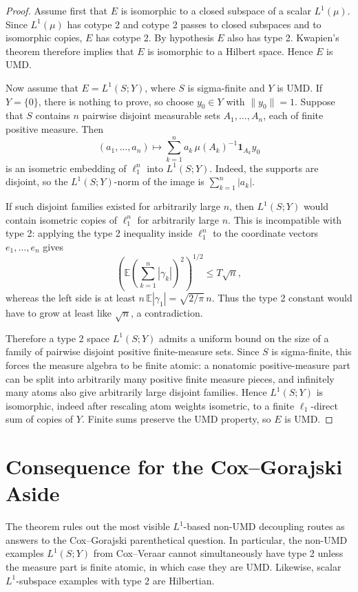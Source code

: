 \documentclass[11pt]{article}
\newcommand{\E}{\mathbb{E}}
\begin{document}
\begin{proof}
Assume first that \(E\) is isomorphic to a closed subspace of a scalar
\(L^1(\mu)\).  Since \(L^1(\mu)\) has cotype 2 and cotype 2 passes to closed
subspaces and to isomorphic copies, \(E\) has cotype 2.  By hypothesis \(E\)
also has type 2.  Kwapien's theorem therefore implies that \(E\) is isomorphic
to a Hilbert space.  Hence \(E\) is UMD.

Now assume that \(E=L^1(S;Y)\), where \(S\) is sigma-finite and \(Y\) is UMD.
If \(Y=\{0\}\), there is nothing to prove, so choose \(y_0\in Y\) with
\(\|y_0\|=1\).  Suppose that \(S\) contains \(n\) pairwise disjoint measurable
sets \(A_1,\ldots,A_n\), each of finite positive measure.  Then
\[
   (a_1,\ldots,a_n)\mapsto
   \sum_{k=1}^n a_k\,\mu(A_k)^{-1}\mathbf{1}_{A_k}y_0
\]
is an isometric embedding of \(\ell_1^n\) into \(L^1(S;Y)\).  Indeed, the
supports are disjoint, so the \(L^1(S;Y)\)-norm of the image is
\(\sum_{k=1}^n |a_k|\).

If such disjoint families existed for arbitrarily large \(n\), then
\(L^1(S;Y)\) would contain isometric copies of \(\ell_1^n\) for arbitrarily
large \(n\).  This is incompatible with type 2: applying the type 2 inequality
inside \(\ell_1^n\) to the coordinate vectors \(e_1,\ldots,e_n\) gives
\[
  \left(\E\left(\sum_{k=1}^n |\gamma_k|\right)^2\right)^{1/2}
  \leq T\sqrt{n},
\]
whereas the left side is at least
\(n\,\E|\gamma_1|=\sqrt{2/\pi}\,n\).  Thus the type 2 constant would have to
grow at least like \(\sqrt n\), a contradiction.

Therefore a type 2 space \(L^1(S;Y)\) admits a uniform bound on the size of a
family of pairwise disjoint positive finite-measure sets.  Since \(S\) is
sigma-finite, this forces the measure algebra to be finite atomic: a nonatomic
positive-measure part can be split into arbitrarily many positive finite
measure pieces, and infinitely many atoms also give arbitrarily large disjoint
families.  Hence \(L^1(S;Y)\) is isomorphic, indeed after rescaling atom
weights isometric, to a finite \(\ell_1\)-direct sum of copies of \(Y\).
Finite sums preserve the UMD property, so \(E\) is UMD.
\end{proof}

\section*{Consequence for the Cox--Gorajski Aside}

The theorem rules out the most visible \(L^1\)-based non-UMD decoupling routes
as answers to the Cox--Gorajski parenthetical question.  In particular, the
non-UMD examples \(L^1(S;Y)\) from Cox--Veraar cannot simultaneously have type
2 unless the measure part is finite atomic, in which case they are UMD.
Likewise, scalar \(L^1\)-subspace examples with type 2 are Hilbertian.
\end{document}
